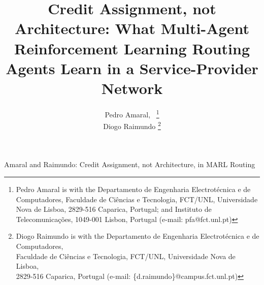 \documentclass[10pt,journal,comsoc]{IEEEtran}
\begin{document}
\title{Credit Assignment, not Architecture: What Multi-Agent Reinforcement Learning Routing Agents Learn in a Service-Provider Network}

\author{
  Pedro Amaral,~%
  \thanks{Pedro Amaral is with the Departamento de Engenharia Electrot\'ecnica e de Computadores, Faculdade de Ci\^encias e Tecnologia,
  FCT/UNL, Universidade Nova de Lisboa, 2829-516 Caparica, Portugal; and Instituto de Telecomunica\c{c}\~oes, 1049-001 Lisbon, Portugal (e-mail: pfa@fct.unl.pt)}%
  \\
  Diogo Raimundo%
  \thanks{Diogo Raimundo is with the Departamento de Engenharia Electrot\'ecnica e de Computadores,\\ Faculdade de Ci\^encias e Tecnologia, FCT/UNL, Universidade Nova de Lisboa,\\ 2829-516 Caparica, Portugal (e-mail: \{d.raimundo\}@campus.fct.unl.pt)}
}

%
{Amaral and Raimundo: Credit Assignment, not Architecture, in MARL Routing}

\maketitle
\end{document}
